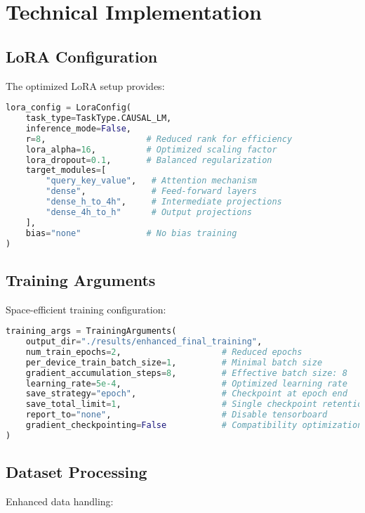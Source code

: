 \documentclass[12pt,a4paper]{article}
\begin{document}
\section{Technical Implementation}

\subsection{LoRA Configuration}
The optimized LoRA setup provides:

\begin{lstlisting}[language=Python, caption=Enhanced LoRA Configuration]
lora_config = LoraConfig(
    task_type=TaskType.CAUSAL_LM,
    inference_mode=False,
    r=8,                    # Reduced rank for efficiency
    lora_alpha=16,          # Optimized scaling factor
    lora_dropout=0.1,       # Balanced regularization
    target_modules=[
        "query_key_value",   # Attention mechanism
        "dense",             # Feed-forward layers
        "dense_h_to_4h",     # Intermediate projections
        "dense_4h_to_h"      # Output projections
    ],
    bias="none"             # No bias training
)
\end{lstlisting}

\subsection{Training Arguments}
Space-efficient training configuration:

\begin{lstlisting}[language=Python, caption=Optimized Training Arguments]
training_args = TrainingArguments(
    output_dir="./results/enhanced_final_training",
    num_train_epochs=2,                    # Reduced epochs
    per_device_train_batch_size=1,         # Minimal batch size
    gradient_accumulation_steps=8,         # Effective batch size: 8
    learning_rate=5e-4,                    # Optimized learning rate
    save_strategy="epoch",                 # Checkpoint at epoch end
    save_total_limit=1,                    # Single checkpoint retention
    report_to="none",                      # Disable tensorboard
    gradient_checkpointing=False           # Compatibility optimization
)
\end{lstlisting}

\subsection{Dataset Processing}
Enhanced data handling:
\end{document}
